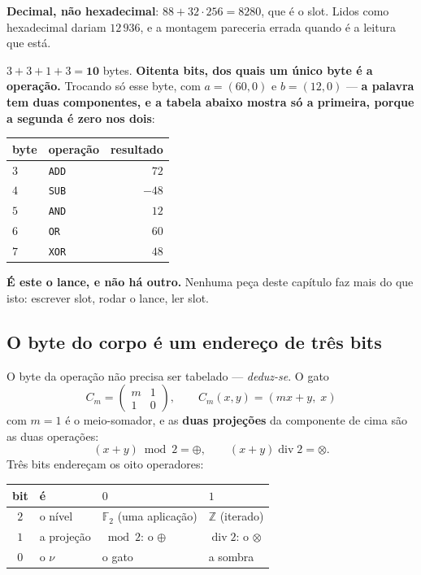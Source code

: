 \documentclass[11pt]{article}
\newcommand{\code}[1]{\texttt{\small #1}}
\theoremstyle{plain}
\theoremstyle{remark}
\begin{document}
\noindent \textbf{Decimal, não hexadecimal}: $88+32\cdot256=8280$, que é o
slot. Lidos como hexadecimal dariam $12\,936$, e a montagem pareceria errada
quando é a leitura que está.

\noindent $3+3+1+3=\mathbf{10}$ bytes. \textbf{Oitenta bits, dos quais um único
byte é a operação.} Trocando só esse byte, com $a=(60,0)$ e $b=(12,0)$ ---
\textbf{a palavra tem duas componentes, e a tabela abaixo mostra só a
primeira, porque a segunda é zero nos dois}:

\begin{center}
\begin{tabular}{@{}llr@{}}
\toprule
byte & operação & resultado \\
\midrule
$3$ & \code{ADD} & $72$ \\
$4$ & \code{SUB} & $-48$ \\
$5$ & \code{AND} & $12$ \\
$6$ & \code{OR} & $60$ \\
$7$ & \code{XOR} & $48$ \\
\bottomrule
\end{tabular}
\end{center}

\noindent \textbf{É este o lance, e não há outro.} Nenhuma peça deste capítulo
faz mais do que isto: escrever slot, rodar o lance, ler slot.

\subsection{O byte do corpo é um endereço de três bits}\label{sec:80gato}

O byte da operação não precisa ser tabelado --- \emph{deduz-se}. O gato
\[
C_m=\begin{pmatrix} m & 1\\ 1 & 0\end{pmatrix},
\qquad C_m(x,y)=(mx+y,\;x)
\]
com $m=1$ é o meio-somador, e as \textbf{duas projeções} da componente de cima
são as duas operações:
\[
(x+y)\bmod 2=\oplus,\qquad (x+y)\operatorname{div}2=\otimes .
\]
Três bits endereçam os oito operadores:

\begin{center}
\begin{tabular}{@{}clll@{}}
\toprule
bit & é & $0$ & $1$ \\
\midrule
$2$ & o nível & $\mathbb{F}_2$ (uma aplicação) & $\mathbb{Z}$ (iterado) \\
$1$ & a projeção & $\bmod 2$: o $\oplus$ & $\operatorname{div}2$: o $\otimes$ \\
$0$ & o $\nu$ & o gato & a sombra \\
\bottomrule
\end{tabular}
\end{center}
\end{document}
